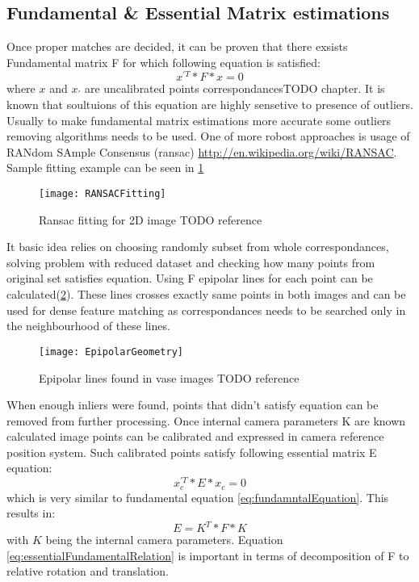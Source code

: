 \subsection{Fundamental \& Essential Matrix estimations}
Once proper matches are decided, it can be proven that there exsists Fundamental matrix F for which following equation is satisfied:
\begin{equation} \label{eq:fundamntalEquation}
{x}^{'T} * F * x = 0
\end{equation} 
where $x$ and ${x}_{'}$ are uncalibrated points correspondances\cite{HartletMultipleView}TODO chapter. It is known that soultuions of this equation are highly sensetive to presence of outliers. Usually to make fundamental matrix estimations more accurate some outliers removing algorithms needs to be used. One of more robost approaches is usage of RANdom SAmple Consensus (\gls{ransac}) \url{http://en.wikipedia.org/wiki/RANSAC}. Sample fitting example can be seen in \ref{fig:RANSACFitting}
\begin{figure}[p]
    \centering
    \texttt{[image: RANSACFitting]}
    \caption{Ransac fitting for 2D image TODO reference}
    \label{fig:RANSACFitting}
\end{figure}
It basic idea relies on choosing randomly subset from whole correspondances, solving problem with reduced dataset and checking how many points from original set satisfies equation.
Using F epipolar lines for each point can be calculated(\ref{fig:EpipolarGeometry}). These lines crosses exactly same points in both images and can be used for dense feature matching as correspondances needs to be searched only in the neighbourhood of these lines.
\begin{figure}[p]
    \centering
    \texttt{[image: EpipolarGeometry]}
    \caption{Epipolar lines found in vase images TODO reference}
    \label{fig:EpipolarGeometry}
\end{figure}
When enough inliers were found, points that didn't satisfy equation can be removed from further processing.
Once internal camera parameters K are known calculated image points can be calibrated and expressed in camera reference position system. Such calibrated points satisfy following essential matrix E equation:
\begin{equation} \label{eq:essentialEquation}
{x}_{c}^{'T} * E * x_{c} = 0
\end{equation} 
which is very similar to fundamental equation \ref{eq:fundamntalEquation}. This results in:
\begin{equation} \label{eq:essentialFundamentalRelation}
E = K^{T} * F * K
\end{equation} 
with $K$ being the internal camera parameters. Equation \ref{eq:essentialFundamentalRelation} is important in terms of decomposition of F to relative rotation and translation.

